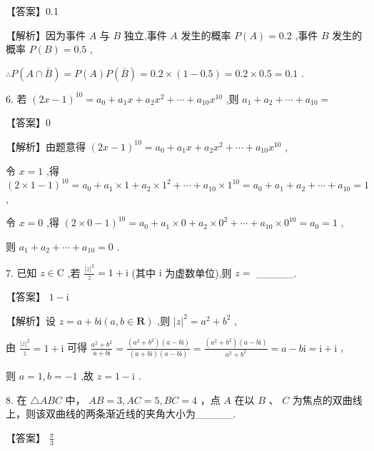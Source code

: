\documentclass[10pt]{article}
\begin{document}
【答案】0.1

【解析】因为事件 \(A\) 与 \(B\) 独立,事件 \(A\) 发生的概率 \(P\left( A\right)  = {0.2}\) ,事件 \(B\) 发生的概率 \(P\left( B\right)  = {0.5}\) ,

\(\therefore P\left( {A \cap  \bar{B}}\right)  = P\left( A\right) P\left( \bar{B}\right)  = {0.2} \times  \left( {1 - {0.5}}\right)  = {0.2} \times  {0.5} = {0.1}\) .

6. 若 \({\left( 2x - 1\right) }^{10} = {a}_{0} + {a}_{1}x + {a}_{2}{x}^{2} + \cdots  + {a}_{10}{x}^{10}\) ,则 \({a}_{1} + {a}_{2} + \cdots  + {a}_{10} =\)

【答案】0

【解析】由题意得 \({\left( 2x - 1\right) }^{10} = {a}_{0} + {a}_{1}x + {a}_{2}{x}^{2} + \cdots  + {a}_{10}{x}^{10}\) ,

令 \(x = 1\) ,得 \({\left( 2 \times  1 - 1\right) }^{10} = {a}_{0} + {a}_{1} \times  1 + {a}_{2} \times  {1}^{2} + \cdots  + {a}_{10} \times  {1}^{10} = {a}_{0} + {a}_{1} + {a}_{2} + \cdots  + {a}_{10} = 1\) ,

令 \(x = 0\) ,得 \({\left( 2 \times  0 - 1\right) }^{10} = {a}_{0} + {a}_{1} \times  0 + {a}_{2} \times  {0}^{2} + \cdots  + {a}_{10} \times  {0}^{10} = {a}_{0} = 1\) ,

则 \({a}_{1} + {a}_{2} + \cdots  + {a}_{10} = 0\) .

7. 已知 \(z \in  \mathrm{C}\) ,若 \(\frac{{\left| z\right| }^{2}}{z} = 1 + \mathrm{i}\) (其中 \(\mathrm{i}\) 为虚数单位),则 \(z =\) \_\_\_\_\_.

【答案】 \(1 - \mathrm{i}\)

【解析】设 \(z = a + b\mathrm{i}\left( {a,b \in  \mathbf{R}}\right)\) ,则 \({\left| z\right| }^{2} = {a}^{2} + {b}^{2}\) ,

由 \(\frac{{\left| z\right| }^{2}}{z} = 1 + \mathrm{i}\) 可得 \(\frac{{a}^{2} + {b}^{2}}{a + b\mathrm{i}} = \frac{\left( {{a}^{2} + {b}^{2}}\right) \left( {a - b\mathrm{i}}\right) }{\left( {a + b\mathrm{i}}\right) \left( {a - b\mathrm{i}}\right) } = \frac{\left( {{a}^{2} + {b}^{2}}\right) \left( {a - b\mathrm{i}}\right) }{{a}^{2} + {b}^{2}} = a - b\mathrm{i} = \mathrm{i} + \mathrm{i}\) ,

则 \(a = 1,b =  - 1\) ,故 \(z = 1 - \mathrm{i}\) .

8. 在 \(\bigtriangleup  {ABC}\) 中， \({AB} = 3,{AC} = 5,{BC} = 4\) ，点 \(A\) 在以 \(B\) 、 \(C\) 为焦点的双曲线上，则该双曲线的两条渐近线的夹角大小为\_\_\_\_\_.

【答案】 \(\frac{\pi }{3}\)
\end{document}
